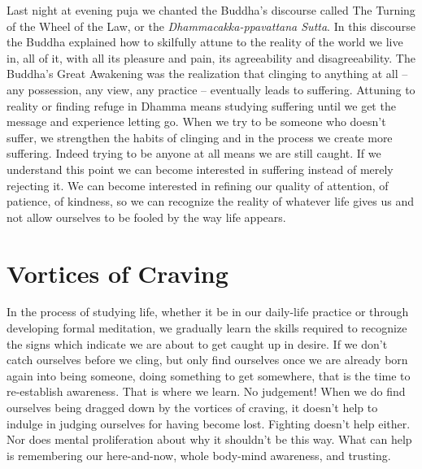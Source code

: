 Last night at evening puja we chanted the Buddha’s discourse called
The Turning of the Wheel of the Law, or the \emph{Dhammacakka-ppavattana
Sutta}. In this discourse the Buddha explained how to skilfully attune
to the reality of the world we live in, all of it, with all its pleasure
and pain, its agreeability and disagreeability. The Buddha’s Great
Awakening was the realization that clinging to anything at all – any
possession, any view, any practice – eventually leads to suffering.
Attuning to reality or finding refuge in Dhamma means studying suffering
until we get the message and experience letting go. When we try to be
someone who doesn’t suffer, we strengthen the habits of clinging and in
the process we create more suffering. Indeed trying to be anyone at all
means we are still caught. If we understand this point we can become
interested in suffering instead of merely rejecting it. We can become
interested in refining our quality of attention, of patience, of
kindness, so we can recognize the reality of whatever life gives us and
not allow ourselves to be fooled by the way life appears.

\section{Vortices of Craving}

In the process of studying life, whether it be in our daily-life
practice or through developing formal meditation, we gradually learn the
skills required to recognize the signs which indicate we are about to
get caught up in desire. If we don’t catch ourselves before we cling,
but only find ourselves once we are already born again into being
someone, doing something to get somewhere, that is the time to
re-establish awareness. That is where we learn. No judgement! When we do
find ourselves being dragged down by the vortices of craving, it doesn’t
help to indulge in judging ourselves for having become lost. Fighting
doesn’t help either. Nor does mental proliferation about why it
shouldn’t be this way. What can help is remembering our here-and-now,
whole body-mind awareness, and trusting.


